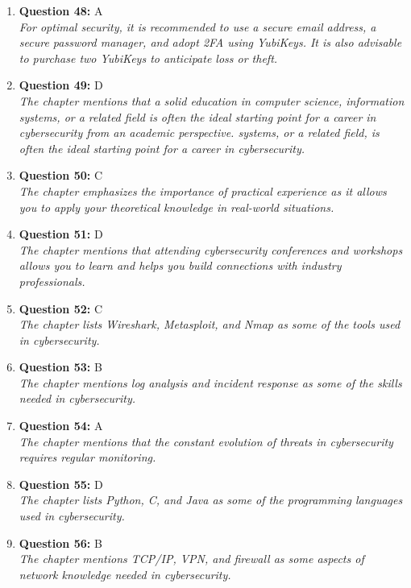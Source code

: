 \documentclass[12pt,a4paper]{article}
\begin{document}
\begin{enumerate}
\item \textbf{Question 48:} A
\\ \textit{For optimal security, it is recommended to use a secure
email address, a secure password manager, and adopt 2FA
using YubiKeys. It is also advisable to purchase two
YubiKeys to anticipate loss or theft.}

\item \textbf{Question 49:} D
\\ \textit{The chapter mentions that a solid education in computer
science, information systems, or a related field is often
the ideal starting point for a career in cybersecurity from
an academic perspective. systems, or a related field, is
often the ideal starting point for a career in
cybersecurity.}

\item \textbf{Question 50:} C
\\ \textit{The chapter emphasizes the importance of practical
experience as it allows you to apply your theoretical
knowledge in real-world situations.}

\item \textbf{Question 51:} D
\\ \textit{The chapter mentions that attending cybersecurity conferences and workshops allows you to learn and helps you build connections with industry professionals.}

\item \textbf{Question 52:} C
\\ \textit{The chapter lists Wireshark, Metasploit, and Nmap as some
of the tools used in cybersecurity.}

\item \textbf{Question 53:} B
\\ \textit{The chapter mentions log analysis and incident response as
some of the skills needed in cybersecurity.}

\item \textbf{Question 54:} A
\\ \textit{The chapter mentions that the constant evolution of threats
in cybersecurity requires regular monitoring.}

\item \textbf{Question 55:} D
\\ \textit{The chapter lists Python, C, and Java as some of the
programming languages used in cybersecurity.}

\item \textbf{Question 56:} B
\\ \textit{The chapter mentions TCP/IP, VPN, and firewall as some aspects of network knowledge needed in cybersecurity.}


\end{enumerate}
\end{document}
